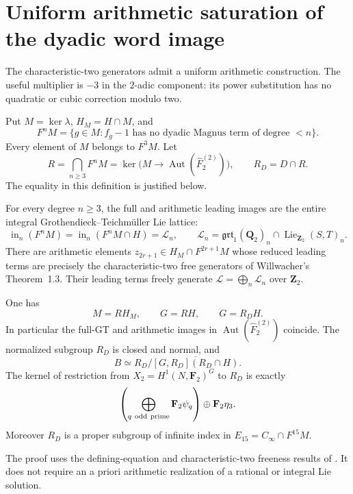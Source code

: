 \section{Uniform arithmetic saturation of the dyadic word image}
\label{sec:fr-uniform-dyadic-lie}

The characteristic-two generators admit a uniform arithmetic
construction. The useful multiplier is $-3$ in the $2$-adic
component: its power substitution has no quadratic or cubic
correction modulo two.

Put $M=\ker\lambda$, $H_M=H\cap M$, and
\[
 F^nM=\{g\in M:f_g-1\text{ has no dyadic Magnus term of degree }<n\}.
\]
Every element of $M$ belongs to $F^3M$. Let
\[
 R=\bigcap_{n\ge3}F^nM
   =\ker\bigl(M\longrightarrow
                \operatorname{Aut}(\widehat F_2^{(2)})\bigr),
 \qquad R_D=D\cap R.
\]
The equality in this definition is justified below.

\begin{theorem}\label{thm:fr-uniform-dyadic-saturation}
For every degree $n\ge3$, the full and arithmetic leading images
are the entire integral Grothendieck--Teichm\"uller Lie lattice:
\[
 \operatorname{in}_n(F^nM)
 =\operatorname{in}_n(F^nM\cap H)
 =\mathcal L_n,
 \qquad
 \mathcal L_n=
 \mathfrak{grt}_1(\mathbf Q_2)_n
          \cap\operatorname{Lie}_{\mathbf Z_2}(S,T)_n.
\]
There are arithmetic elements $z_{2r+1}\in H_M\cap F^{2r+1}M$
whose reduced leading terms are precisely the characteristic-two
free generators of Willwacher's Theorem~1.3. Their leading terms
freely generate $\mathcal L=\bigoplus_n\mathcal L_n$ over
$\mathbf Z_2$.

One has
\[
 M=RH_M,\qquad G=RH,\qquad G=R_DH.
\]
In particular the full-GT and arithmetic images in
$\operatorname{Aut}(\widehat F_2^{(2)})$ coincide.
The normalized subgroup $R_D$ is closed and normal, and
\[
 B\simeq R_D/\overline{[G,R_D](R_D\cap H)}.
\]
The kernel of restriction from $X_2=H^1(N,\mathbf F_2)^G$ to
$R_D$ is exactly
\[
 \left(\bigoplus_{q\ {\rm odd\ prime}}\mathbf F_2\psi_q\right)
                   \oplus\mathbf F_2\eta_3.
\]
Moreover $R_D$ is a proper subgroup of infinite index in
$E_{15}=C_\infty\cap F^{15}M$.
\end{theorem}

The proof uses the defining-equation and characteristic-two
freeness results of
\cite[equations (1)--(6), p.~1; \S1.1 and Theorem~1.3, p.~2;
\S4.3, p.~9]{Willwacher}. It does not require an a priori
arithmetic realization of a rational or integral Lie solution.

